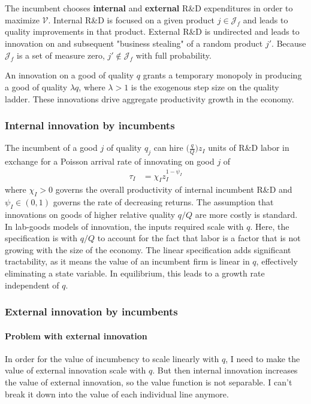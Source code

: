 \documentclass[12pt,english]{article}
\theoremstyle{remark}
\begin{document}
The incumbent chooses \textbf{internal} and \textbf{external} R\&D expenditures in order to maximize $\mathcal{V}$. Internal R\&D is focused on a given product $j \in \mathcal{J}_f$ and leads to quality improvements in that product. External R\&D is undirected and leads to innovation on and subsequent "business stealing" of a random product $j'$. Because $\mathcal{J}_f$ is a set of measure zero, $j' \notin \mathcal{J}_f$ with full probability. 

An innovation on a good of quality $q$ grants a temporary monopoly in producing a good of quality $\lambda q$, where $\lambda > 1$ is the exogenous step size on the quality ladder. These innovations drive aggregate productivity growth in the economy.

\subsubsection{Internal innovation by incumbents}

The incumbent of a good $j$ of quality $q_j$ can hire $\big(\frac{q}{Q}\big)z_I$ units of R\&D labor in exchange for a Poisson arrival rate of innovating on good $j$ of
\begin{align}
\tau_I &= \chi_I z_I^{1-\psi_I}  \label{incumbent_innovation_rate}
\end{align}
where $\chi_I > 0$ governs the overall productivity of internal incumbent R\&D and $\psi_I \in (0,1)$ governs the rate of decreasing returns. The assumption that innovations on goods of higher relative quality $q/Q$ are more costly is standard. In lab-goods models of innovation, the inputs required scale with $q$. Here, the specification is with $q/Q$ to account for the fact that labor is a factor that is not growing with the size of the economy. The linear specification adds significant tractability, as it means the value of an incumbent firm is linear in $q$, effectively eliminating a state variable. In equilibrium, this leads to a growth rate independent of $q$. 

\subsubsection{External innovation by incumbents}

\paragraph{Problem with external innovation}

In order for the value of incumbency to scale linearly with $q$, I need to make the value of external innovation scale with $q$. But then internal innovation increases the value of external innovation, so the value function is not separable. I can't break it down into the value of each individual line anymore. 
\end{document}

